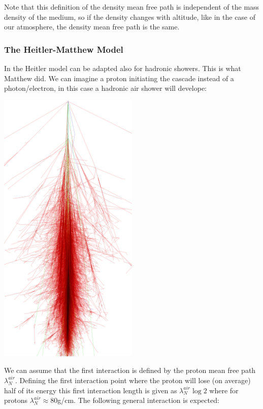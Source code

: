 \documentclass[
  letterpaper,
  DIV=11,
  numbers=noendperiod]{scrreprt}
\begin{document}
Note that this definition of the density mean free path is independent
of the mass density of the medium, so if the density changes with
altitude, like in the case of our atmosphere, the density mean free path
is the same.

\subsubsection*{The Heitler-Matthew
Model}\label{the-heitler-matthew-model}

In the Heitler model can be adapted also for hadronic showers. This is
what Matthew did. We can imagine a proton initiating the cascade instead
of a photon/electron, in this case a hadronic air shower will develope:

\begin{center}
\includegraphics[width=0.5\textwidth,height=\textheight]{images/proton_eas.png}
\end{center}

We can assume that the first interaction is defined by the proton mean
free path \(\lambda^{air}_N\). Defining the first interaction point
where the proton will lose (on average) half of its energy this first
interaction length is given as \(\lambda^{air}_{N} \log 2\) where for
protons \(\lambda^{air}_N \approx 80\)g/cm. The following general
interaction is expected:
\end{document}
